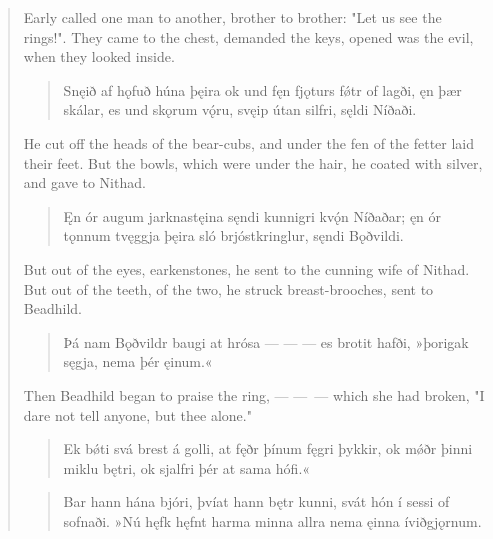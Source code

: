 \begin{verse}
\bvb Early called one man to another, brother to brother: "Let us see the rings!". They came to the chest, demanded the keys, opened was the evil, when they looked inside.

\begin{verse}
\bva Snęið af hǫfuð \hld húna þęira
ok und fęn fjǫturs \hld fǿtr of lagði,
ęn þær skálar, \hld es und skǫrum vǫ́ru,
svęip útan silfri, \hld sęldi Níðaði. \\%
\end{verse}

\bvb He cut off the heads of the bear-cubs\footnotemark[25], and under the fen of the fetter laid their feet. But the bowls\footnotemark[26], which were under the hair, he coated with silver, and gave to Nithad.

\begin{verse}
\bva Ęn ór augum \hld jarknastęina
sęndi kunnigri \hld kvǫ́n Níðaðar;
ęn ór tǫnnum \hld tvęggja þęira
sló brjóstkringlur, \hld sęndi Bǫðvildi. \\%
\end{verse}

\bvb But out of the eyes, earkenstones, he sent to the cunning wife of Nithad. But out of the teeth, of the two, he struck breast-brooches, sent to Beadhild.

\begin{verse}
\bva Þá nam Bǫðvildr \hld baugi at hrósa
— — — \hld es brotit hafði,
»þorigak sęgja, \hld nema þér ęinum.«  \\%
\end{verse}

\bvb Then Beadhild began to praise the ring, — — — which she had broken, "I dare not tell anyone, but thee alone."

\begin{verse}
\bva Ek bǿti svá \hld brest á golli,
at fęðr þínum \hld fęgri þykkir,
ok mǿðr þinni \hld miklu bętri,
ok sjalfri þér \hld at sama hófi.«  \\%
\end{verse}


\begin{verse}
\bva Bar hann hána bjóri, \hld þvíat hann bętr kunni,
svát hón í sessi \hld of sofnaði.
»Nú hęfk hęfnt \hld harma minna
allra nema ęinna \hld íviðgjǫrnum. \\%
\end{verse}


\end{verse}
